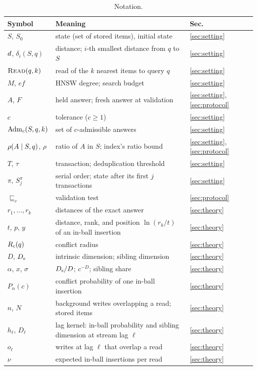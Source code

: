 \documentclass[sigconf, nonacm, review]{acmart}
\begin{document}
\begin{table}[t]
\caption{Notation.}
\label{tab:notation}
\small
\setlength{\tabcolsep}{3pt}
\begin{tabular}{@{}lp{}l@{}}
\toprule
Symbol & Meaning & Sec.\\
\midrule
$S$, $S_0$ & state (set of stored items), initial state & \ref{sec:setting}\\
$d$, $\delta_i(S,q)$ & distance; $i$-th smallest distance from $q$ to $S$ & \ref{sec:setting}\\
$\textsc{Read}(q,k)$ & read of the $k$ nearest items to query $q$ & \ref{sec:setting}\\
$M$, $\mathit{ef}$ & HNSW degree; search budget & \ref{sec:setting}\\
$A$, $F$ & held answer; fresh answer at validation & \ref{sec:setting}, \ref{sec:protocol}\\
$c$ & tolerance ($c\ge1$) & \ref{sec:setting}\\
$\mathrm{Adm}_c(S,q,k)$ & set of $c$-admissible answers & \ref{sec:setting}\\
$\rho(A\mid S,q)$, $\rho$ & ratio of $A$ in $S$; index's ratio bound & \ref{sec:setting}, \ref{sec:protocol}\\
$T$, $\tau$ & transaction; deduplication threshold & \ref{sec:setting}\\
$\pi$, $S^\pi_j$ & serial order; state after its first $j$ transactions & \ref{sec:setting}\\
$\sqsubseteq_c$ & validation test & \ref{sec:protocol}\\
$r_1,\dots,r_k$ & distances of the exact answer & \ref{sec:theory}\\
$t$, $p$, $y$ & distance, rank, and position $\ln(r_k/t)$ of an in-ball insertion & \ref{sec:theory}\\
$R_c(q)$ & conflict radius & \ref{sec:theory}\\
$D$, $D_{\mathrm{s}}$ & intrinsic dimension; sibling dimension & \ref{sec:theory}\\
$\alpha$, $x$, $\sigma$ & $D_{\mathrm{s}}/D$; $c^{-D}$; sibling share & \ref{sec:theory}\\
$P_\alpha(c)$ & conflict probability of one in-ball insertion & \ref{sec:theory}\\
$n$, $N$ & background writes overlapping a read; stored items & \ref{sec:theory}\\
$h_\ell$, $D_\ell$ & lag kernel: in-ball probability and sibling dimension at stream lag $\ell$ & \ref{sec:theory}\\
$o_\ell$ & writes at lag $\ell$ that overlap a read & \ref{sec:theory}\\
$\nu$ & expected in-ball insertions per read & \ref{sec:theory}\\
\bottomrule
\end{tabular}
\end{table}
\end{document}
